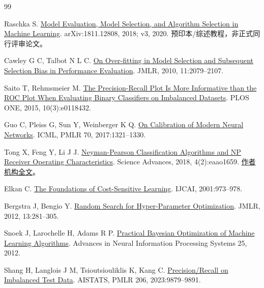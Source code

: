 \begin{thebibliography}{99}\small\raggedright{}
  Raschka S. \protect\href{https://arxiv.org/abs/1811.12808v3}{Model Evaluation, Model Selection, and Algorithm Selection in Machine Learning}. arXiv:1811.12808, 2018; v3, 2020. 预印本/综述教程，非正式同行评审论文。

  Cawley G C, Talbot N L C. \protect\href{https://www.jmlr.org/papers/v11/cawley10a.html}{On Over-fitting in Model Selection and Subsequent Selection Bias in Performance Evaluation}. JMLR, 2010, 11:2079--2107.

  Saito T, Rehmsmeier M. \protect\href{https://journals.plos.org/plosone/article?id=10.1371/journal.pone.0118432}{The Precision-Recall Plot Is More Informative than the ROC Plot When Evaluating Binary Classifiers on Imbalanced Datasets}. PLOS ONE, 2015, 10(3):e0118432.

  Guo C, Pleiss G, Sun Y, Weinberger K Q. \protect\href{https://proceedings.mlr.press/v70/guo17a.html}{On Calibration of Modern Neural Networks}. ICML, PMLR 70, 2017:1321--1330.

  Tong X, Feng Y, Li J J. \protect\href{https://pmc.ncbi.nlm.nih.gov/articles/PMC5804623/}{Neyman-Pearson Classification Algorithms and NP Receiver Operating Characteristics}. Science Advances, 2018, 4(2):eaao1659. \protect\href{https://stat.arizona.edu/sites/default/files/2023-09/Journal\%20Paper\%20091823.pdf}{作者机构全文}。

  Elkan C. \protect\href{https://cseweb.ucsd.edu/~elkan/rescale.pdf}{The Foundations of Cost-Sensitive Learning}. IJCAI, 2001:973--978.

  Bergstra J, Bengio Y. \protect\href{https://www.jmlr.org/papers/v13/bergstra12a.html}{Random Search for Hyper-Parameter Optimization}. JMLR, 2012, 13:281--305.

  Snoek J, Larochelle H, Adams R P. \protect\href{https://proceedings.neurips.cc/paper_files/paper/2012/hash/05311655a15b75fab86956663e1819cd-Abstract.html}{Practical Bayesian Optimization of Machine Learning Algorithms}. Advances in Neural Information Processing Systems 25, 2012.

  Shang H, Langlois J M, Tsioutsiouliklis K, Kang C. \protect\href{https://proceedings.mlr.press/v206/shang23a.html}{Precision/Recall on Imbalanced Test Data}. AISTATS, PMLR 206, 2023:9879--9891.


\end{thebibliography}
